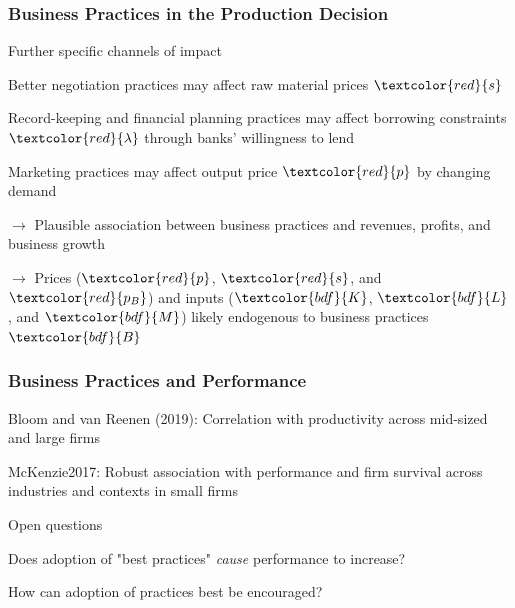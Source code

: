 \documentclass[hideothersubsections, usenames,dvipsnames,11pt]{beamer}
\newenvironment{itemize_2pt}{\itemize\addtolength{\itemsep}{2pt}}{\enditemize}
\newenvironment{enumerate_2pt}{\enumerate\addtolength{\itemsep}{2pt}}{\endenumerate}
\begin{document}
\begin{frame}
\frametitle{Business Practices in the Production Decision}

Further specific channels of impact
\begin{enumerate_2pt}
	\item Better negotiation practices may affect raw material prices $\textcolor{red}{s}$
	\item Record-keeping and financial planning practices may affect borrowing constraints $\textcolor{red}{\lambda}$ through banks' willingness to lend
	\item Marketing practices may affect output price $\textcolor{red}{p}$ by changing demand

	\item[] $\rightarrow$ Plausible association between business practices and revenues, profits, and business growth
	\item[] $\rightarrow$ Prices ($\textcolor{red}{p}$, $\textcolor{red}{s}$, and $\textcolor{red}{p_{B}}$) and inputs ($\textcolor{bdf}{K}$, $\textcolor{bdf}{L}$, and $\textcolor{bdf}{M}$) likely endogenous to business practices $\textcolor{bdf}{B}$
\end{enumerate_2pt}

\end{frame}



\begin{frame}
\frametitle{Business Practices and Performance}
	\begin{itemize_2pt}
	\item Bloom and van Reenen (2019): Correlation with productivity across mid-sized and large firms \citep{Bloom2019}
	\item McKenzie2017: \textcolor{bdf}{Robust association with performance and firm survival} across industries and contexts in small firms
	\end{itemize_2pt}
	
\vspace{0.1in}	
	
	Open questions
	\begin{itemize_2pt}
		\item Does adoption of "best practices" \emph{cause} performance to increase?
		\item How can adoption of practices best be encouraged?
	\end{itemize_2pt}	
	
\end{frame}
\end{document}

